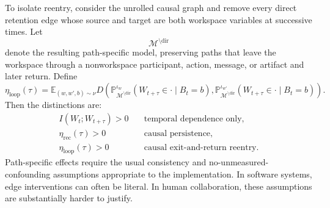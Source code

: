 \documentclass[11pt,letterpaper]{article}
\theoremstyle{plain}
\theoremstyle{definition}
\begin{document}
To isolate reentry, consider the unrolled causal graph and remove every direct
retention edge whose source and target are both workspace variables at
successive times. Let
\[
\mathcal M^{\setminus\mathrm{dir}}
\]
denote the resulting path-specific model, preserving paths that leave the
workspace through a nonworkspace participant, action, message, or artifact and
later return. Define
\[
\boxed{
\eta_{\mathrm{loop}}(\tau)
=
\mathbb E_{(w,w',b)\sim\nu}
D\!\left(
\mathbb P_{\mathcal M^{\setminus\mathrm{dir}}}^{\iota_w}
(W_{t+\tau}\in\cdot\mid B_t=b),
\mathbb P_{\mathcal M^{\setminus\mathrm{dir}}}^{\iota_{w'}}
(W_{t+\tau}\in\cdot\mid B_t=b)
\right).
}
\]
Then the distinctions are:
\[
\begin{aligned}
I(W_t;W_{t+\tau})>0
&\quad\text{temporal dependence only},\\
\eta_{\mathrm{rec}}(\tau)>0
&\quad\text{causal persistence},\\
\eta_{\mathrm{loop}}(\tau)>0
&\quad\text{causal exit-and-return reentry}.
\end{aligned}
\]
Path-specific effects require the usual consistency and no-unmeasured-confounding
assumptions appropriate to the implementation. In software systems, edge
interventions can often be literal. In human collaboration, these assumptions
are substantially harder to justify.
\end{document}

